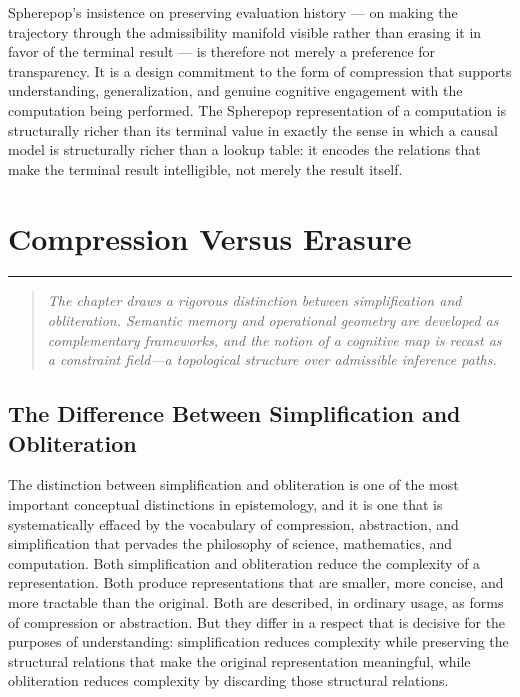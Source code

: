 \documentclass[12pt,openany]{book}
\theoremstyle{plain}
\theoremstyle{definition}
\theoremstyle{remark}
\newcommand{\chapterrule}{%
  \vspace{4pt}%
  {\color{SpherepopBlue}\rule{\textwidth}{0.8pt}}%
  \vspace{10pt}%
}
\newenvironment{chapterprecis}{%
  \begin{quote}\small\itshape}{%
  \end{quote}\medskip}
\begin{document}
Spherepop's insistence on preserving evaluation history — on making the trajectory through the admissibility manifold visible rather than erasing it in favor of the terminal result — is therefore not merely a preference for transparency. It is a design commitment to the form of compression that supports understanding, generalization, and genuine cognitive engagement with the computation being performed. The Spherepop representation of a computation is structurally richer than its terminal value in exactly the sense in which a causal model is structurally richer than a lookup table: it encodes the relations that make the terminal result intelligible, not merely the result itself.

\chapter{Compression Versus Erasure}
\chapterrule

\begin{chapterprecis}
The chapter draws a rigorous distinction between simplification
and obliteration. Semantic memory and operational geometry are
developed as complementary frameworks, and the notion of a
cognitive map is recast as a constraint field---a topological
structure over admissible inference paths.
\end{chapterprecis}

\section{The Difference Between Simplification and Obliteration}

The distinction between simplification and obliteration is one of the most important conceptual distinctions in epistemology, and it is one that is systematically effaced by the vocabulary of compression, abstraction, and simplification that pervades the philosophy of science, mathematics, and computation. Both simplification and obliteration reduce the complexity of a representation. Both produce representations that are smaller, more concise, and more tractable than the original. Both are described, in ordinary usage, as forms of compression or abstraction. But they differ in a respect that is decisive for the purposes of understanding: simplification reduces complexity while preserving the structural relations that make the original representation meaningful, while obliteration reduces complexity by discarding those structural relations.
\end{document}
